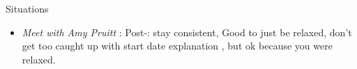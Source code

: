 \documentclass[serif, mathserif, final]{beamer}
\begin{document}
\begin{frame}{}
\begin{columns}
\begin{column}{0.20\linewidth}
\begin{block}{Situations}
\begin{itemize}
               \item \tiny \textit{Meet with Amy Pruitt} : Post-:
                 stay consistent, Good to just be relaxed, don't get
                 too caught up with start date explanation , but ok
                 because you were relaxed. 
    \end{itemize}
  \end{block}
\end{column}%
\end{columns}

\end{frame}
\end{document}
